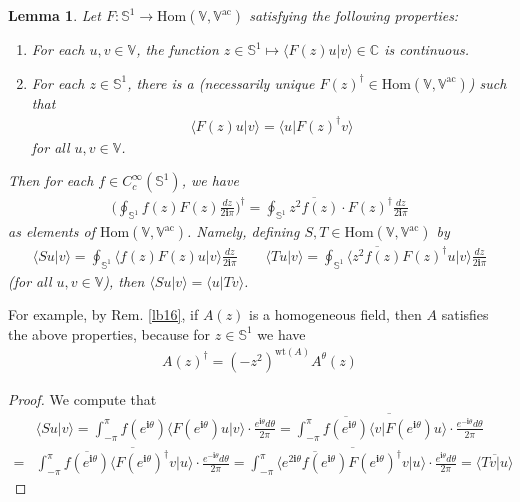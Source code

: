 \documentclass[12pt,b5paper,notitlepage]{article}
\theoremstyle{definition}
\theoremstyle{plain}
\newtheorem{lm}[df]{Lemma}
\newcommand{\ovl}{\overline}
\newcommand{\Hom}{\mathrm{Hom}}
\newcommand{\bk}[1]{\langle {#1}\rangle}
\newcommand{\im}{\mathbf{i}}
\newcommand{\Vbb}{\mathbb V}
\newcommand{\Cbb}{\mathbb C}
\newcommand{\wt}{\mathrm{wt}}
\newcommand{\Sbb}{{\mathbb S}}
\newcommand{\ac}{\mathrm{ac}}
\numberwithin{equation}{section}
\begin{document}
\begin{lm}\label{lb36}
Let $F:\Sbb^1\rightarrow \Hom(\Vbb,\Vbb^\ac)$ satisfying the following properties:
\begin{enumerate}[label=(\alph*)]
\item For each $u,v\in\Vbb$, the function $z\in\Sbb^1\mapsto \bk{F(z)u|v}\in\Cbb$ is continuous.
\item For each $z\in\Sbb^1$, there is a (necessarily unique $F(z)^\dagger\in\Hom(\Vbb,\Vbb^\ac)$) such that
\begin{align*}
\bk{F(z)u|v}=\bk{u|F(z)^\dagger v}
\end{align*}
for all $u,v\in\Vbb$.
\end{enumerate}
Then for each $f\in C_c^\infty(\Sbb^1)$, we have
\begin{align}\label{eq58}
\bigg(\oint\nolimits_{\Sbb^1}f(z)F(z)\frac{dz}{2\im\pi}\bigg)^\dagger=\oint\nolimits_{\Sbb^1}\ovl{z^2f(z)}\cdot F(z)^\dagger \frac{dz}{2\im\pi}
\end{align}
as elements of $\Hom(\Vbb,\Vbb^\ac)$. Namely, defining $S,T\in\Hom(\Vbb,\Vbb^\ac)$ by
\begin{gather*}
\bk{Su|v}=\oint_{\Sbb^1}\nolimits\bk{f(z)F(z)u|v}\frac{dz}{2\im\pi}\qquad \bk{Tu|v}=\oint_{\Sbb^1}\nolimits\bk{\ovl{z^2f(z)}F(z)^\dagger u|v}\frac{dz}{2\im\pi}
\end{gather*}
(for all $u,v\in\Vbb$), then $\bk{Su|v}=\bk{u|Tv}$.
\end{lm}

For example, by Rem. \ref{lb16}, if $A(z)$ is a homogeneous field, then $A$ satisfies the above properties, because for $z\in\Sbb^1$ we have
\begin{align}\label{eq61}
A(z)^\dagger=(-z^2)^{\wt(A)}A^\theta(z)
\end{align}

\begin{proof}
We compute that
\begin{align*}
&\bk{Su|v}=\int_{-\pi}^\pi f(e^{\im\theta})\bk{F(e^{\im\theta})u|v}\cdot \frac{e^{\im\theta}d\theta}{2\pi}=\ovl{\int_{-\pi}^\pi \ovl{f(e^{\im\theta})}\bk{v|F(e^{\im\theta})u}\cdot \frac{e^{-\im\theta}d\theta}{2\pi}}\\
=&\ovl{\int_{-\pi}^\pi \ovl{f(e^{\im\theta})}\bk{F(e^{\im\theta})^\dagger v|u}\cdot \frac{e^{-\im\theta}d\theta}{2\pi}}=\ovl{\int_{-\pi}^\pi \bk{\ovl{e^{2\im\theta}f(e^{\im\theta})}F(e^{\im\theta})^\dagger v|u}\cdot \frac{e^{\im\theta}d\theta}{2\pi}}=\ovl{\bk{Tv|u}}
\end{align*}
\end{proof}
\end{document}
